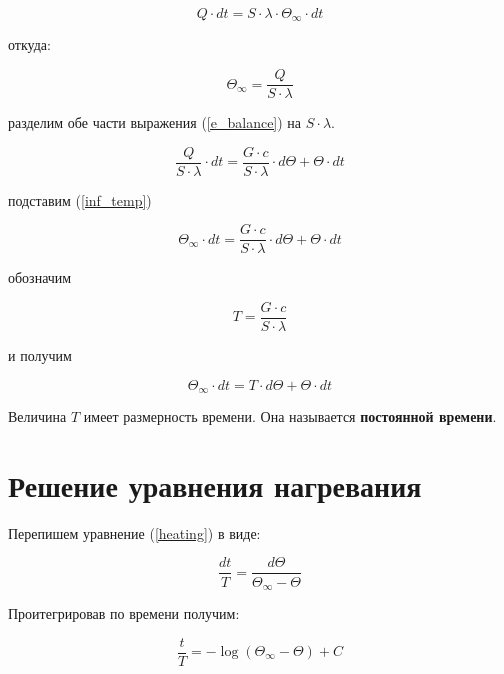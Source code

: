 \documentclass[a4paper]{article}
\begin{document}
\begin{equation}
Q{\cdot}dt=S{\cdot}{\lambda}{\cdot}{\Theta}_{\infty}{\cdot}dt
\end{equation}

откуда:

\begin{equation}
\label{inf_temp}
{\Theta}_{\infty}=\frac{Q}{S{\cdot}{\lambda}}
\end{equation}

разделим обе части выражения (\ref{e_balance}) на $S{\cdot}{\lambda}$.

\begin{equation}
\frac{Q}{S{\cdot}{\lambda}}{\cdot}dt=\frac{G{\cdot}c}{S{\cdot}{\lambda}}{\cdot}d{\Theta}+{\Theta}{\cdot}dt
\end{equation}

подставим (\ref{inf_temp})

\begin{equation}
{\Theta}_{\infty}{\cdot}dt=\frac{G{\cdot}c}{S{\cdot}{\lambda}}{\cdot}d{\Theta}+{\Theta}{\cdot}dt
\end{equation}

обозначим

\begin{equation}
T=\frac{G{\cdot}c}{S{\cdot}{\lambda}}
\end{equation}

и получим

\begin{equation}
\label{heating}
{\Theta}_{\infty}{\cdot}dt=T{\cdot}d{\Theta}+{\Theta}{\cdot}dt
\end{equation}

Величина $T$ имеет размерность времени. Она называется \textbf{постоянной времени}.

\section{Решение уравнения нагревания}

Перепишем уравнение (\ref{heating}) в виде:

\begin{equation}
\label{new_heating}
\frac{dt}{T}=\frac{d{\Theta}}{{\Theta}_{\infty}-{\Theta}}
\end{equation}

Проитегрировав по времени получим:

\begin{equation}
\label{integrated}
\frac{t}{T}=-\log{({\Theta}_{\infty}-{\Theta})}+C
\end{equation}
\end{document}
